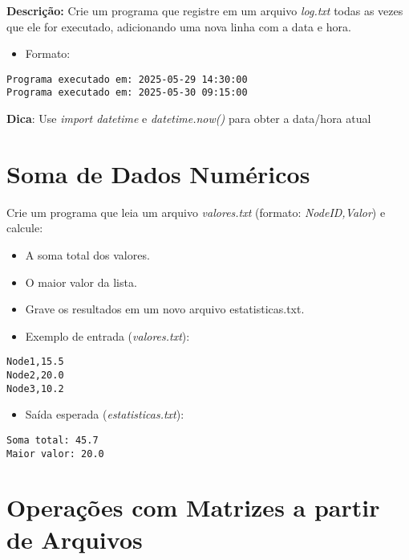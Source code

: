 \textbf{Descrição:} Crie um programa que registre em um arquivo \textit{log.txt} todas as vezes que ele for executado, adicionando uma nova linha com a data e hora.

\begin{itemize}
    \item Formato:
\end{itemize}
    
\begin{verbatim}
Programa executado em: 2025-05-29 14:30:00  
Programa executado em: 2025-05-30 09:15:00      
\end{verbatim}


\textbf{Dica}: Use \textit{import datetime} e \textit{datetime.now()} para obter a data/hora atual

\section{Soma de Dados Numéricos}

Crie um programa que leia um arquivo \textit{valores.txt} (formato: \textit{NodeID,Valor}) e calcule:

\begin{itemize}
\item A soma total dos valores.

    \item O maior valor da lista.

    \item Grave os resultados em um novo arquivo estatisticas.txt.
\end{itemize}

\begin{itemize}
    \item Exemplo de entrada (\textit{valores.txt}):
\end{itemize}

\begin{verbatim}
Node1,15.5  
Node2,20.0  
Node3,10.2     
\end{verbatim}

\begin{itemize}
    \item Saída esperada (\textit{estatisticas.txt}):
\end{itemize}
\begin{verbatim}
Soma total: 45.7  
Maior valor: 20.0  
\end{verbatim}

\section{Operações com Matrizes a partir de Arquivos}

